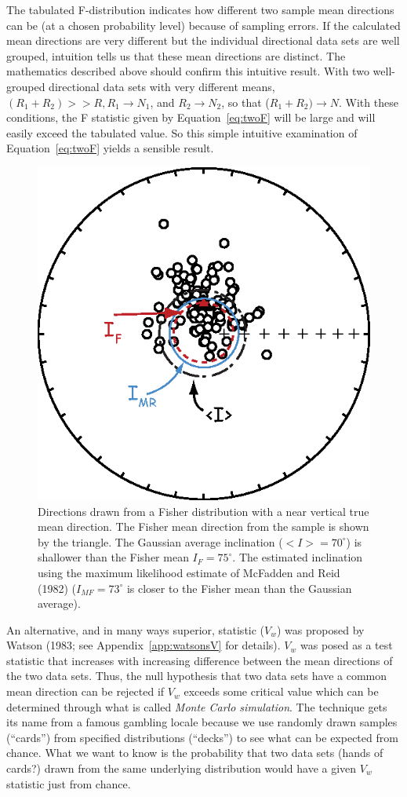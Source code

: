 The tabulated F-distribution indicates how different two sample mean directions can be (at a chosen
probability level) because of sampling errors. If the calculated mean directions are very different but the
individual directional data sets are well grouped, intuition tells us that these mean directions are distinct.
The mathematics described above should confirm this intuitive result. With two well-grouped directional
data sets with very different means, $ (R_1 + R_2) >> R, R_1 \rightarrow N_1$, and $R_2 \rightarrow N_2$, so that ($R_1 + R_2) \rightarrow N$. With these conditions, the F statistic given by Equation~\ref{eq:twoF}  will be large and
will easily exceed the tabulated value. So this simple intuitive examination of Equation~\ref{eq:twoF}  yields a
sensible result.


\begin{figure}[htb]
\centering  \includegraphics[width= 7.5 cm]{EPSfiles/incfish.eps}
\caption{Directions drawn from a Fisher distribution with a near vertical true
mean direction.  The Fisher mean direction from the sample is shown by the
triangle.  The Gaussian average inclination ($<I>= 70^{\circ}$) is shallower than the
Fisher mean $I_F = 75^{\circ}$. The estimated inclination using the maximum likelihood estimate of McFadden and Reid (1982) ($I_{MF}=73^{\circ}$ is closer to the Fisher mean than the Gaussian average).}
\label{fig:incfish}
\end{figure} \nocite{mcfadden82}



  An alternative, and in many ways superior,  statistic ($V_w$) was proposed by 
  Watson
(1983; see Appendix~\ref{app:watsonsV} for details).   \nocite{watson83}
$V_w$ was posed as a test statistic that increases with increasing difference between the mean
directions of the two data sets.  Thus, the null hypothesis that two data sets have a common mean
direction can be rejected if $V_w$ exceeds some critical value which can be determined through what is called
{\it Monte Carlo simulation}.  The technique gets its name from a famous gambling locale because we use randomly drawn samples (``cards'') from specified  distributions (``decks'')  to 
see what can be expected from chance.  What we want to know is  the probability that two data sets (hands of cards?) drawn from the same underlying distribution would have a given $V_w$ statistic just from chance.  

